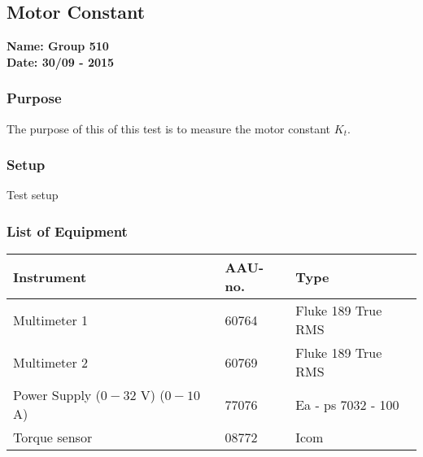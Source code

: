 \pagebreak
\subsection{Motor Constant} %
\textbf{Name: Group 510}\\
\textbf{Date: 30/09 - 2015}

\subsubsection{Purpose}
The purpose of this of this test is to measure the motor constant $K_t$.

\subsubsection{Setup}
Test setup

\subsubsection{List of Equipment}

\begin{table}[H]
\begin{tabular}{|l|l|p{4cm}|}
\hline%
  \textbf{Instrument}                        &  \textbf{AAU-no.}  &  \textbf{Type}       \\
\hline%
  Multimeter 1                               &  60764             &  Fluke 189 True RMS  \\
\hline%
  Multimeter 2                   		         &  60769             &  Fluke 189 True RMS  \\
\hline%
  Power Supply ($0 - 32$ V) ($0 - 10$ A)     &  77076             &  Ea - ps 7032 - 100  \\
\hline%
  Torque sensor                              &  08772             &  Icom                \\
\hline%
\end{tabular}
\end{table}


